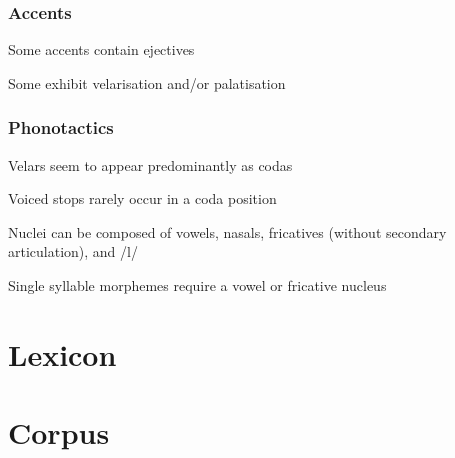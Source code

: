 \documentclass{memoir}
\begin{document}





\section{Accents}

Some accents contain ejectives

Some exhibit velarisation and/or palatisation

\section{Phonotactics}

Velars seem to appear predominantly as codas

Voiced stops rarely occur in a coda position

Nuclei can be composed of vowels, nasals, fricatives (without secondary articulation), and /l/

Single syllable morphemes require a vowel or fricative nucleus



\part{Lexicon}

\part{Corpus}

\backmatter
\printindex
\end{document}

